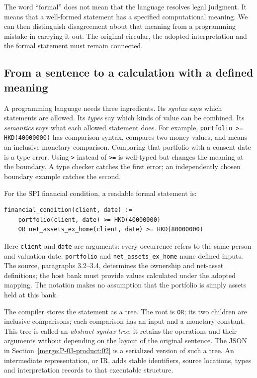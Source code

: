 \documentclass[12pt,a4paper,oneside,openany]{book}
\begin{document}
The word ``formal'' does not mean that the language resolves legal judgment.
It means that a well-formed statement has a specified computational meaning.
We can then distinguish disagreement about that meaning from a programming
mistake in carrying it out. The original circular, the adopted interpretation
and the formal statement must remain connected.

\subsection{From a sentence to a calculation with a defined meaning}
\label{merge:P-01a-language-lesson:01}


A programming language needs three ingredients. Its \emph{syntax} says which
statements are allowed. Its \emph{types} say which kinds of value can be combined.
Its \emph{semantics} says what each allowed statement does. For example,
\texttt{portfolio >= HKD(40000000)} has comparison syntax, compares two money
values, and means an inclusive monetary comparison. Comparing that portfolio
with a consent date is a type error. Using \texttt{>} instead of \texttt{>=} is
well-typed but changes the meaning at the boundary. A type checker catches the
first error; an independently chosen boundary example catches the second.

For the SPI financial condition, a readable formal statement is:
\begin{lstlisting}[caption={Illustrative controlled syntax for Annex 1 paragraph 3.1. This is a teaching notation, not Catala or Stipula source.}]
financial_condition(client, date) :=
    portfolio(client, date) >= HKD(40000000)
    OR net_assets_ex_home(client, date) >= HKD(80000000)
\end{lstlisting}
Here \texttt{client} and \texttt{date} are arguments: every occurrence refers to
the same person and valuation date. \texttt{portfolio} and
\texttt{net\_assets\_ex\_home} name defined inputs. The source, paragraphs
3.2--3.4, determines the ownership and net-asset definitions; the host bank must
provide values calculated under the adopted mapping. The notation makes no
assumption that the portfolio is simply assets held at this bank.

The compiler stores the statement as a tree. The root is \texttt{OR}; its two
children are inclusive comparisons; each comparison has an input and a monetary
constant. This tree is called an \emph{abstract syntax tree}: it retains the
operations and their arguments without depending on the layout of the original
sentence. The JSON in Section~\ref{merge:P-03-product:02} is a serialized version of such
a tree. An intermediate representation, or IR, adds stable identifiers, source
locations, types and interpretation records to that executable structure.
\end{document}
